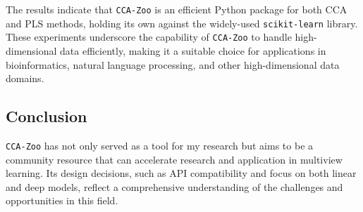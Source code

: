 The results indicate that \texttt{CCA-Zoo} is an efficient Python package for both CCA and PLS methods, holding its own against the widely-used \texttt{scikit-learn} library.
These experiments underscore the capability of \texttt{CCA-Zoo} to handle high-dimensional data efficiently, making it a suitable choice for applications in bioinformatics, natural language processing, and other high-dimensional data domains.

\subsection{Conclusion}

\texttt{CCA-Zoo} has not only served as a tool for my research but aims to be a community resource that can accelerate research and application in multiview learning.
Its design decisions, such as API compatibility and focus on both linear and deep models, reflect a comprehensive understanding of the challenges and opportunities in this field.
